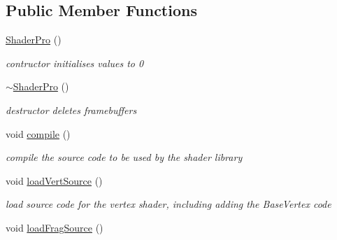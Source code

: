 \subsection*{Public Member Functions}
\begin{DoxyCompactItemize}
\item 
\hypertarget{struct_shader_pro_a6a156214f2ccce2b6995cd27b1489e8e}{\hyperlink{struct_shader_pro_a6a156214f2ccce2b6995cd27b1489e8e}{Shader\-Pro} ()}\label{struct_shader_pro_a6a156214f2ccce2b6995cd27b1489e8e}

\begin{DoxyCompactList}\small\item\em contructor initialises values to 0 \end{DoxyCompactList}\item 
\hypertarget{struct_shader_pro_a5a188aa3f9272f910d0911da07ce131d}{\hyperlink{struct_shader_pro_a5a188aa3f9272f910d0911da07ce131d}{$\sim$\-Shader\-Pro} ()}\label{struct_shader_pro_a5a188aa3f9272f910d0911da07ce131d}

\begin{DoxyCompactList}\small\item\em destructor deletes framebuffers \end{DoxyCompactList}\item 
\hypertarget{struct_shader_pro_a4044a4eac55f3a13b7bffc932dc6b980}{void \hyperlink{struct_shader_pro_a4044a4eac55f3a13b7bffc932dc6b980}{compile} ()}\label{struct_shader_pro_a4044a4eac55f3a13b7bffc932dc6b980}

\begin{DoxyCompactList}\small\item\em compile the source code to be used by the shader library \end{DoxyCompactList}\item 
\hypertarget{struct_shader_pro_abe5d4cf1c8eb0457e022a9b4df208056}{void \hyperlink{struct_shader_pro_abe5d4cf1c8eb0457e022a9b4df208056}{load\-Vert\-Source} ()}\label{struct_shader_pro_abe5d4cf1c8eb0457e022a9b4df208056}

\begin{DoxyCompactList}\small\item\em load source code for the vertex shader, including adding the Base\-Vertex code \end{DoxyCompactList}\item 
\hypertarget{struct_shader_pro_a1b91bc81ec80f37ee9ff9145a6604272}{void \hyperlink{struct_shader_pro_a1b91bc81ec80f37ee9ff9145a6604272}{load\-Frag\-Source} ()}\label{struct_shader_pro_a1b91bc81ec80f37ee9ff9145a6604272}


\end{DoxyCompactItemize}
